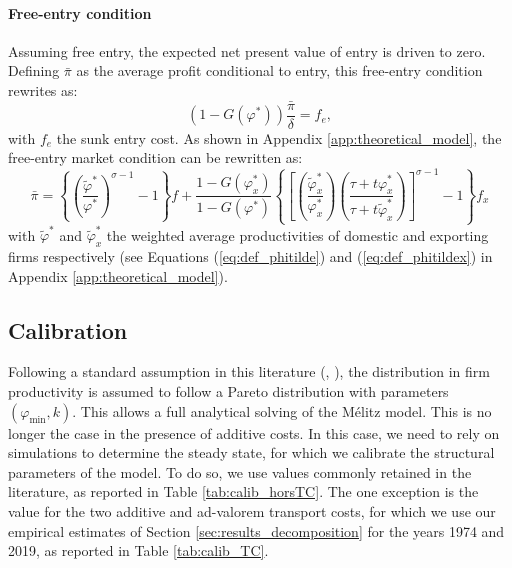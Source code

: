 \documentclass[a4paper,11pt]{article}
\begin{document}
\paragraph{Free-entry condition} Assuming free entry, the expected net present value of entry is driven to zero.
Defining $\bar{\pi}$ as the average profit conditional to entry, this free-entry condition rewrites as:
\begin{equation}
\left(1-G(\varphi^\ast)\right)\frac{\bar{\pi}}{\delta} = f_e, \label{eq:FEC}
\end{equation}
\noindent with $f_e$ the sunk entry cost. As shown in Appendix \ref{app:theoretical_model}, the free-entry market condition can be rewritten as:
\begin{equation}
\bar{\pi} = \left\{\left(\frac{\widetilde{\varphi}^\ast}{\varphi^\ast}\right)^{\sigma-1}-1 \right\}f +  \frac{1-G(\varphi_x^\ast)}{1-G(\varphi^\ast)}\left\{\left[\left(\frac{\widetilde{\varphi}_x^\ast}{\varphi_x^\ast}\right)\left(\frac{\tau+ t \varphi^\ast_x}{\tau+ t \widetilde{\varphi}^\ast_x}\right)\right]^{\sigma-1}-1 \right\}f_x \label{eq:ZCP}
\end{equation}
\noindent with $\widetilde{\varphi}^\ast$ and $\widetilde{\varphi}_x^\ast$ the weighted average productivities of domestic and exporting firms respectively (see Equations (\ref{eq:def_phitilde}) and (\ref{eq:def_phitildex}) in Appendix \ref{app:theoretical_model}).


\subsection{Calibration}

Following a standard assumption in this literature (\cite{Irrazabal_2015}, \cite{melitz-redding-Handbk-IT-2014}), the distribution in firm productivity is assumed to follow a Pareto distribution with parameters $(\varphi_{\text{min}},k)$. This allows a full analytical solving of the M\'{e}litz model. This is no longer the case in the presence of additive costs. In this case, we need to rely on simulations to determine the steady state, for which we calibrate the structural parameters of the model. To do so, we use values commonly retained in the literature, as reported in Table \ref{tab:calib_horsTC}. The one exception is the value for the two additive and ad-valorem transport costs, for which we use our empirical estimates of Section \ref{sec:results_decomposition} for the years 1974 and 2019, as reported in Table \ref{tab:calib_TC}.
\end{document}
